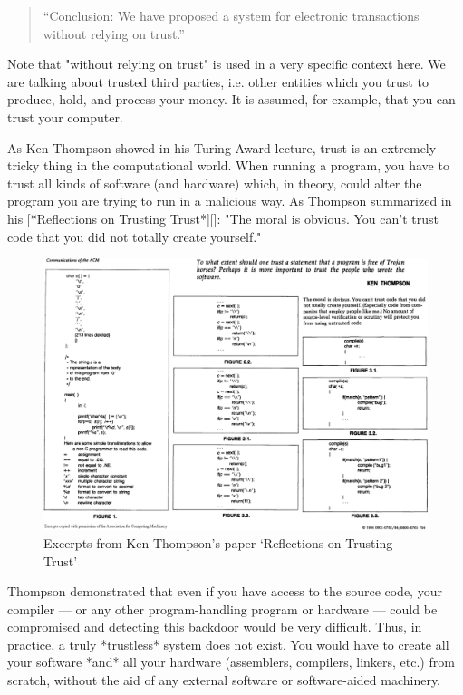 \begin{quotation}
``Conclusion: We have proposed a system for electronic transactions
without relying on trust.''
\end{quotation}

Note that "without relying on trust" is used in a very specific context
here. We are talking about trusted third parties, i.e. other entities
which you trust to produce, hold, and process your money. It is assumed,
for example, that you can trust your computer.

As Ken Thompson showed in his Turing Award lecture, trust is an
extremely tricky thing in the computational world. When running a
program, you have to trust all kinds of software (and hardware) which,
in theory, could alter the program you are trying to run in a malicious
way. As Thompson summarized in his [*Reflections on Trusting Trust*][]:
"The moral is obvious. You can't trust code that you did not totally
create yourself."

\begin{figure}
  \includegraphics{assets/images/ken-thompson-hack.png}
  \caption{Excerpts from Ken Thompson's paper `Reflections on Trusting Trust'}
  \label{fig:ken-thompson-hack}
\end{figure}

Thompson demonstrated that even if you have access to the source code,
your compiler --- or any other program-handling program or
hardware --- could be compromised and detecting this backdoor would be
very difficult. Thus, in practice, a truly *trustless* system does not
exist. You would have to create all your software *and* all your
hardware (assemblers, compilers, linkers, etc.) from scratch, without
the aid of any external software or software-aided machinery.

